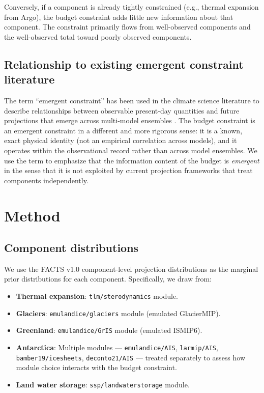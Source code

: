 \documentclass[11pt]{article}
\begin{document}
Conversely, if a component is already tightly constrained (e.g., thermal expansion from Argo), the budget constraint adds little new information about that component.  The constraint primarily flows from well-observed components and the well-observed total toward poorly observed components.

\subsection{Relationship to existing emergent constraint literature}

The term ``emergent constraint'' has been used in the climate science literature to describe relationships between observable present-day quantities and future projections that emerge across multi-model ensembles \citep{hall2019progressing}.  The budget constraint is an emergent constraint in a different and more rigorous sense: it is a known, exact physical identity (not an empirical correlation across models), and it operates within the observational record rather than across model ensembles.  We use the term to emphasize that the information content of the budget is \emph{emergent} in the sense that it is not exploited by current projection frameworks that treat components independently.


\section{Method}
\label{sec:method}

\subsection{Component distributions}

We use the FACTS v1.0 component-level projection distributions \citep{kopp2023facts} as the marginal prior distributions for each component.  Specifically, we draw from:

\begin{itemize}
  \item \textbf{Thermal expansion}: \texttt{tlm/sterodynamics} module.
  \item \textbf{Glaciers}: \texttt{emulandice/glaciers} module (emulated GlacierMIP).
  \item \textbf{Greenland}: \texttt{emulandice/GrIS} module (emulated ISMIP6).
  \item \textbf{Antarctica}: Multiple modules --- \texttt{emulandice/AIS}, \texttt{larmip/AIS}, \texttt{bamber19/icesheets}, \texttt{deconto21/AIS} --- treated separately to assess how module choice interacts with the budget constraint.
  \item \textbf{Land water storage}: \texttt{ssp/landwaterstorage} module.
\end{itemize}
\end{document}
